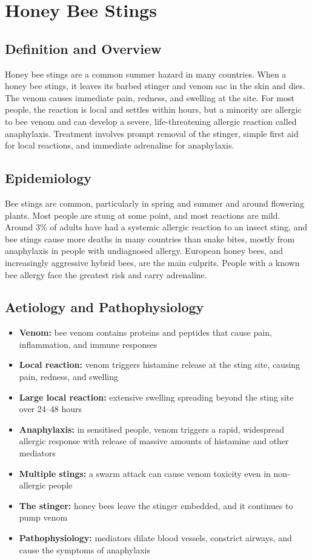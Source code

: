 \chapter{Honey Bee Stings}

\section*{Definition and Overview}
Honey bee stings are a common summer hazard in many countries. When a honey bee stings, it leaves its barbed stinger and venom sac in the skin and dies. The venom causes immediate pain, redness, and swelling at the site. For most people, the reaction is local and settles within hours, but a minority are allergic to bee venom and can develop a severe, life-threatening allergic reaction called anaphylaxis. Treatment involves prompt removal of the stinger, simple first aid for local reactions, and immediate adrenaline for anaphylaxis.

\section*{Epidemiology}
Bee stings are common, particularly in spring and summer and around flowering plants. Most people are stung at some point, and most reactions are mild. Around 3\% of adults have had a systemic allergic reaction to an insect sting, and bee stings cause more deaths in many countries than snake bites, mostly from anaphylaxis in people with undiagnosed allergy. European honey bees, and increasingly aggressive hybrid bees, are the main culprits. People with a known bee allergy face the greatest risk and carry adrenaline.

\section*{Aetiology and Pathophysiology}
\begin{itemize}
    \item \textbf{Venom:} bee venom contains proteins and peptides that cause pain, inflammation, and immune responses
    \item \textbf{Local reaction:} venom triggers histamine release at the sting site, causing pain, redness, and swelling
    \item \textbf{Large local reaction:} extensive swelling spreading beyond the sting site over 24--48 hours
    \item \textbf{Anaphylaxis:} in sensitised people, venom triggers a rapid, widespread allergic response with release of massive amounts of histamine and other mediators
    \item \textbf{Multiple stings:} a swarm attack can cause venom toxicity even in non-allergic people
    \item \textbf{The stinger:} honey bees leave the stinger embedded, and it continues to pump venom
    \item \textbf{Pathophysiology:} mediators dilate blood vessels, constrict airways, and cause the symptoms of anaphylaxis
\end{itemize}

